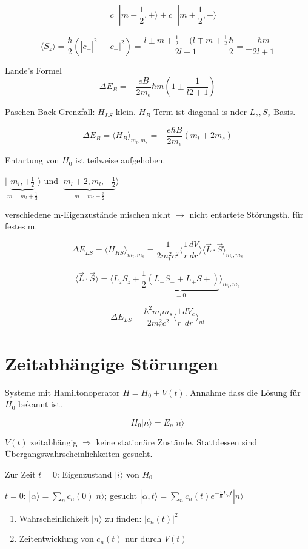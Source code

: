 \[ = c_+|m-\frac{1}{2},+\rangle + c_-|m+\frac{1}{2},-\rangle\]

\[ \langle S_z\rangle = \frac{\hbar}{2}(|c_+|^2-|c_-|^2)= \frac{l\pm m+\frac{1}{2}-(l\mp m+\frac{1}{2}}{2l+1}\frac{\hbar}{2}=\pm \frac{\hbar m}{2l+1}\]

Lande's Formel
\[\boxed{\Delta E_B = -\frac{eB}{2m_e}\hbar m(1\pm \frac{1}{l2+1})}\]

Paschen-Back Grenzfall: \(H_{LS}\) klein. \(H_B\) Term ist diagonal is nder \(L_z,S_z\) Basis.

\[ \Delta E_B = \langle H_B\rangle_{m_l,m_s} = -\frac{e\hbar B}{2m_e}(m_l + 2m_s)\]

Entartung von \(H_0\) ist teilweise aufgehoben.

\( |\underbrace{m_l,+\frac{1}{2}}_{m=m_l+\frac{1}{2}}\rangle\) und \(|\underbrace{ m_l+2,m_l,-\frac{1}{2}}_{m=m_l+\frac{3}{2}}\rangle\)

verschiedene m-Eigenzustände mischen nicht \(\rightarrow\) nicht entartete Störungsth. für festes m.

\[\Delta E_{LS} = \langle H_{HS} \rangle_{m_l,m_s} = \frac{1}{2m^2_lc^2}\langle \frac{1}{r} \frac{dV}{dr}\rangle\langle\vec L\cdot\vec S\rangle_{m_l,m_s}\]

\[\langle\vec L\cdot\vec S\rangle = \langle L_zS_z + \underbrace{\frac{1}{2}(L_+S_-+L_+S+)}_{=0}\rangle_{m_l,m_s}\]

\[ \boxed{\Delta E_{LS} = \frac{\hbar^2 m_lm_s}{2m^2_ec^2}\langle\frac{1}{r}\frac{dV_c}{dr}\rangle_{nl}}\]


\section{Zeitabhängige Störungen}

Systeme mit Hamiltonoperator \(H=H_0+V(t)\). Annahme dass die Lösung für \(H_0\) bekannt ist.

\[ H_0 |n\rangle = E_n|n\rangle\]

\(V(t)\) zeitabhängig \(\Rightarrow\) keine stationäre Zustände. Stattdessen sind Übergangswahrscheinlichkeiten gesucht.

Zur Zeit \(t=0\): Eigenzustand \(|i\rangle\) von \(H_0\)

\(t=0\): \(|\alpha\rangle = \sum_n c_n(0)|n\rangle\); gesucht \(|\alpha,t\rangle = \sum_n c_n(t)e^{-\frac{i}{\hbar}E_n t} |n\rangle \)

\begin{enumerate}
\item Wahrscheinlichkeit \(|n\rangle\) zu finden: \(|c_n(t)|^2\)
\item Zeitentwicklung von \(c_n(t)\) nur durch \(V(t)\)
\end{enumerate}

